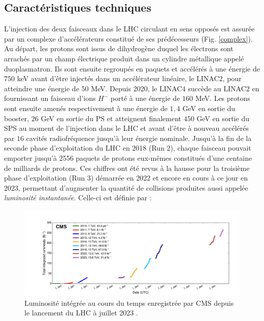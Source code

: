 \subsection{Caractéristiques techniques}

L'injection des deux faisceaux dans le LHC circulant en sens opposés est assurée par un complexe d'accélérateurs constitué de ses prédécesseurs (Fig. \ref{complex}). Au départ, les protons sont issus de dihydrogène duquel les électrons sont arrachés par un champ électrique produit dans un cylindre métallique appelé duoplasmatron. Ils sont ensuite regroupés en paquets et accélérés à une énergie de $750$ keV avant d'être injectés dans un accélérateur linéaire, le LINAC$2$, pour atteindre une énergie de $50$ MeV. Depuis 2020, le LINAC$4$ succède au LINAC$2$ en fournissant un faisceau d'ions $H^-$ porté à une énergie de $160$ MeV. Les protons sont ensuite amenés respectivement à une énergie de $1,4$ GeV en sortie du booster, $26$ GeV en sortie du PS et atteignent finalement $450$ GeV en sortie du SPS au moment de l'injection dans le LHC et avant d'être à nouveau accélérés par $16$ cavités radiofréquence jusqu'à leur énergie nominale. Jusqu'à la fin de la seconde phase d'exploitation du LHC en 2018 (Run 2), chaque faisceau pouvait emporter jusqu'à 2556 paquets de protons eux-mêmes constitués d'une centaine de milliards de protons. Ces chiffres ont été revus à la hausse pour la troisième phase d'exploitation (Run 3) démarrée en 2022 et encore en cours à ce jour en 2023, permettant d'augmenter la quantité de collisions produites aussi appelée \textit{luminosité instantanée}. Celle-ci est définie par : 

\begin{figure}
\centering
    \includegraphics[scale=0.4]{Chapitre3/Images/int_lumi_cumulative_pp_3.png} 
\caption{Luminosité intégrée au cours du temps enregistrée par CMS depuis le lancement du LHC à juillet 2023 \cite{LumiTwiki}.}
\label{lumi}
\end{figure}


